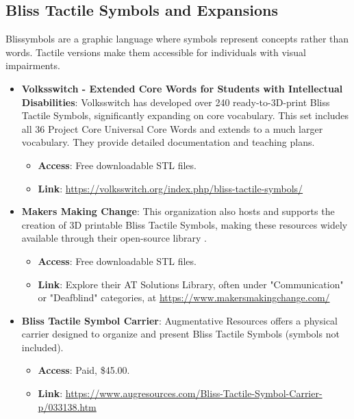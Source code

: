 \subsection{Bliss Tactile Symbols and Expansions}
Blissymbols are a graphic language where symbols represent concepts rather than words. Tactile versions make them accessible for individuals with visual impairments.
\begin{itemize}
    \item \textbf{Volksswitch - Extended Core Words for Students with Intellectual Disabilities}: Volksswitch has developed over 240 ready-to-3D-print Bliss Tactile Symbols, significantly expanding on core vocabulary. This set includes all 36 Project Core Universal Core Words and extends to a much larger vocabulary. They provide detailed documentation and teaching plans.
    \begin{itemize}
        \item \textbf{Access}: Free downloadable STL files.
        \item \textbf{Link}: \url{https://volksswitch.org/index.php/bliss-tactile-symbols/}
    \end{itemize}
    \item \textbf{Makers Making Change}: This organization also hosts and supports the creation of 3D printable Bliss Tactile Symbols, making these resources widely available through their open-source library  \cite{MakersMakingChange}.
    \begin{itemize}
        \item \textbf{Access}: Free downloadable STL files.
        \item \textbf{Link}: Explore their AT Solutions Library, often under "Communication" or "Deafblind" categories, at \url{https://www.makersmakingchange.com/}
    \end{itemize}
    \item \textbf{Bliss Tactile Symbol Carrier}: Augmentative Resources offers a physical carrier designed to organize and present Bliss Tactile Symbols (symbols not included).
    \begin{itemize}
        \item \textbf{Access}: Paid, \$45.00.
        \item \textbf{Link}: \url{https://www.augresources.com/Bliss-Tactile-Symbol-Carrier-p/033138.htm}
    \end{itemize}
\end{itemize}

